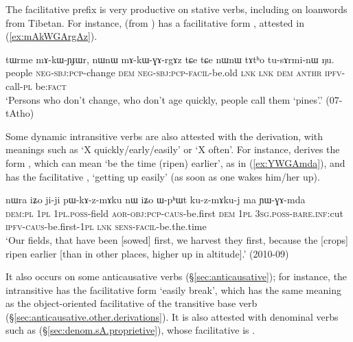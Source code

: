 The facilitative prefix  is very productive on stative verbs, including on loanwords from Tibetan. For instance,  (from ) has a facilitative form , attested in (\ref{ex:mAkWGArgAz}).

\begin{exe}
\ex \label{ex:mAkWGArgAz}
\gll tɯrme mɤ-kɯ-ɲɟɯr, nɯnɯ mɤ-kɯ-ɣɤ-rgɤz tɕe tɕe nɯnɯ tɤtʰo tu-sɤrmi-nɯ ŋu. \\
people \textsc{neg}-\textsc{sbj}:\textsc{pcp}-change \textsc{dem} \textsc{neg}-\textsc{sbj}:\textsc{pcp}-\textsc{facil}-be.old \textsc{lnk} \textsc{lnk} \textsc{dem}  \textsc{anthr} \textsc{ipfv}-call-\textsc{pl} be:\textsc{fact} \\
\glt `Persons who don't change, who don't age quickly, people call them `pines'.' (07-tAtho)
\end{exe}


Some dynamic intransitive verbs are also attested with the  derivation, with meanings such as `X quickly/early/easily' or `X often'. For instance,  derives the form , which can mean `be the time (ripen) earlier', as in (\ref{ex:YWGAmda}), and  has the facilitative , `getting up easily' (as soon as one wakes him/her up).

\begin{exe}
\ex \label{ex:YWGAmda}
\gll nɯra iʑo ji-ji pɯ-kɤ-z-mɤku nɯ iʑo ɯ-pʰɯt ku-z-mɤku-j ma ɲɯ-ɣɤ-mda \\
\textsc{dem}:\textsc{pl} \textsc{1pl} \textsc{1pl}.\textsc{poss}-field \textsc{aor}-\textsc{obj}:\textsc{pcp}-\textsc{caus}-be.first \textsc{dem} \textsc{1pl} \textsc{3sg}.\textsc{poss}-\textsc{bare}.\textsc{inf}:cut \textsc{ipfv}-\textsc{caus}-be.first-\textsc{1pl} \textsc{lnk} \textsc{sens}-\textsc{facil}-be.the.time \\
\glt `Our fields, that have been [sowed] first, we harvest they first, because the [crops] ripen earlier [than in other places, higher up in altitude].' (2010-09)
\end{exe}

It also occurs on some anticausative verbs (§\ref{sec:anticausative}); for instance, the intransitive  has the facilitative form  `easily break', which has the same meaning as the object-oriented facilitative  of the transitive base verb  (§\ref{sec:anticausative.other.derivations}). It is also attested with denominal verbs such as  (§\ref{sec:denom.sA.proprietive}), whose facilitative is . 

